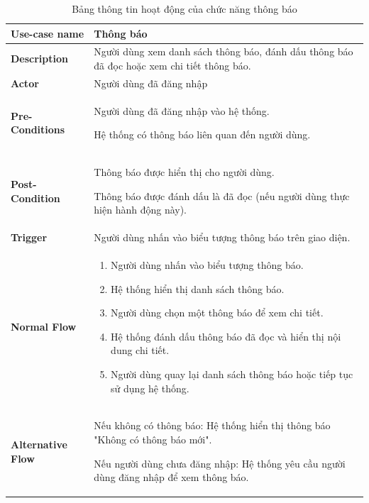 \begin{longtable}{|>{\bfseries}m{4cm}|m{10cm}|}
\caption{Bảng thông tin hoạt động của chức năng thông báo}
\label{table:usecase-noti}\\
\hline

Use-case name & Thông báo
\\
\hline
Description & Người dùng xem danh sách thông báo, đánh dấu thông báo đã đọc hoặc xem chi tiết thông báo.\\
\hline
Actor & Người dùng đã đăng nhập\\
\hline
Pre-Conditions & Người dùng đã đăng nhập vào hệ thống.

Hệ thống có thông báo liên quan đến người dùng.\\
\hline
Post-Condition & Thông báo được hiển thị cho người dùng.

Thông báo được đánh dấu là đã đọc (nếu người dùng thực hiện hành động này).\\
\hline
Trigger & Người dùng nhấn vào biểu tượng thông báo trên giao diện.\\
\hline
Normal Flow &
\begin{enumerate}
    \item Người dùng nhấn vào biểu tượng thông báo.
    \item Hệ thống hiển thị danh sách thông báo.
    \item Người dùng chọn một thông báo để xem chi tiết.
    \item Hệ thống đánh dấu thông báo đã đọc và hiển thị nội dung chi tiết.
    \item Người dùng quay lại danh sách thông báo hoặc tiếp tục sử dụng hệ thống.
\end{enumerate} \\
\hline
Alternative Flow & Nếu không có thông báo: Hệ thống hiển thị thông báo "Không có thông báo mới".

Nếu người dùng chưa đăng nhập: Hệ thống yêu cầu người dùng đăng nhập để xem thông báo.\\
\hline
\end{longtable}


